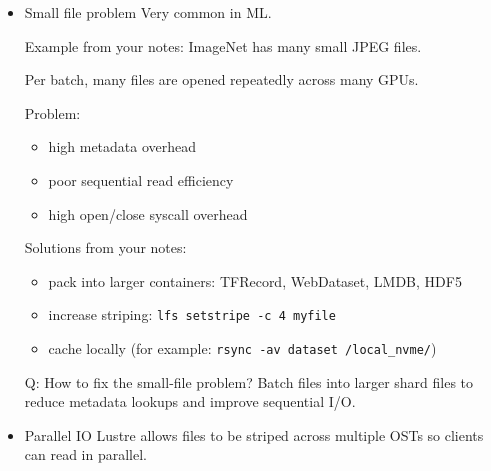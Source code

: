 \documentclass[12pt]{article}
\begin{document}
\begin{itemize}
Symptoms:
\begin{itemize}
\item random training stalls
\item high IOPS but low throughput
\item GPU utilization fluctuates
\item CPU waits on I/O
\end{itemize}

Detection:
\begin{itemize}
\item \texttt{iostat -xm 1} (look for high \texttt{\%util} and high wait)
\item \texttt{lfs df -h} on Lustre
\end{itemize}

Q: Why do small files hurt parallel filesystems?  
Each file access needs metadata lookup, which can overwhelm the metadata server.

Q: Why might training stall randomly?  
Metadata server bottlenecks under high concurrent file-open rates.

\item Small file problem
Very common in ML.

Example from your notes: ImageNet has many small JPEG files.

Per batch, many files are opened repeatedly across many GPUs.

Problem:
\begin{itemize}
\item high metadata overhead
\item poor sequential read efficiency
\item high open/close syscall overhead
\end{itemize}

Solutions from your notes:
\begin{itemize}
\item pack into larger containers: TFRecord, WebDataset, LMDB, HDF5
\item increase striping: \texttt{lfs setstripe -c 4 myfile}
\item cache locally (for example: \texttt{rsync -av dataset /local\_nvme/})
\end{itemize}

Q: How to fix the small-file problem?  
Batch files into larger shard files to reduce metadata lookups and improve sequential I/O.

\item Parallel IO
Lustre allows files to be striped across multiple OSTs so clients can read in parallel.


\end{itemize}
\end{document}
